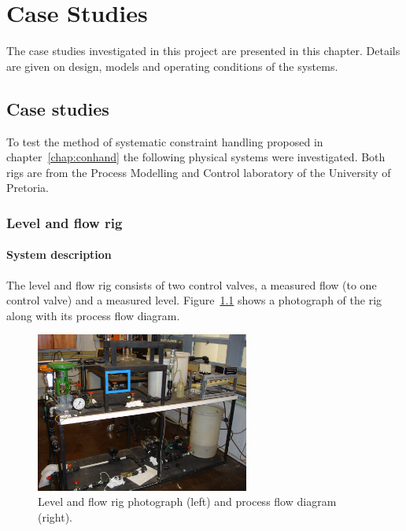 \chapter{Case Studies}\label{chap:casestudies}
\begin{overview}
  The case studies investigated in this project are presented in this chapter.
  Details are given on design, models and operating conditions of the systems. 
\end{overview}

\section{Case studies}
To test the method of systematic constraint handling proposed in chapter~\ref{chap:conhand} the following physical systems were investigated.
Both rigs are from the Process Modelling and Control laboratory of the University of Pretoria.

\subsection{Level and flow rig}
\subsubsection{System description}
The level and flow rig consists of two control valves, a measured flow (to one control valve) and a measured level.
Figure~\ref{fig:flowphoto} shows a photograph of the rig along with its process flow diagram.
\begin{figure}[htbp]
  \centering
    \includegraphics[width=7.0cm]{graph/flowphoto.JPG}
    \scalebox{1}{}  
  \caption[Level and flow rig photograph and flow diagram]{Level and flow rig photograph (left) and process flow diagram (right).}
  \label{fig:flowphoto}
\end{figure}

